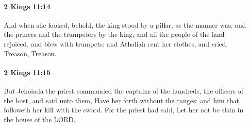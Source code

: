 		\paragraph{2 Kings 11:14} %
			\label{2KINGS-11-14}

			And when she looked, behold, the king stood by a pillar, as the manner was, and the princes and the trumpeters by the king, and all the people of the land rejoiced, and blew with trumpets: and Athaliah rent her clothes, and cried, Treason, Treason.


		\paragraph{2 Kings 11:15} %
			\label{2KINGS-11-15}

			But Jehoiada the priest commanded the captains of the hundreds, the officers of the host, and said unto them, Have her forth without the ranges: and him that followeth her kill with the sword. For the priest had said, Let her not be slain in the house of the LORD.

